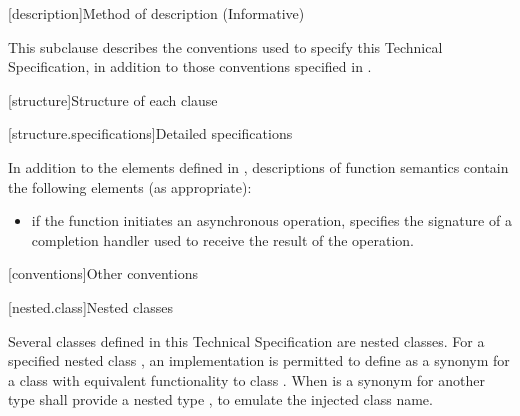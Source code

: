 
[description]{Method of description (Informative)}

\pnum
 This subclause describes the conventions used to specify this Technical Specification, in addition to those conventions specified in .


[structure]{Structure of each clause}


[structure.specifications]{Detailed specifications}

\pnum
In addition to the elements defined in , descriptions of function semantics contain the following elements (as appropriate):

\begin{itemize}
\item
\completionsig if the function initiates an asynchronous operation, specifies the signature of a completion handler used to receive the result of the operation.
\end{itemize}




[conventions]{Other conventions}


[nested.class]{Nested classes}

\pnum
Several classes defined in this Technical Specification are nested classes.
For a specified nested class , an implementation is permitted to
define  as a synonym for a class with equivalent functionality to
class . \enternote When  is a synonym for another
type  shall provide a nested type , to emulate the injected
class name. \exitnote


